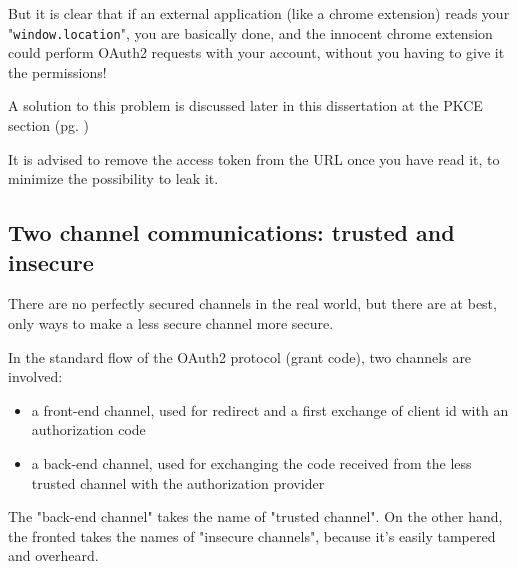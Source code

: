 But it is clear that if an external application (like a chrome extension) reads
your "\texttt{window.location}", you are basically done, and the innocent chrome
extension could perform OAuth2 requests with your account, without you having to
give it the permissions!

A solution to this problem is discussed later in this dissertation at the PKCE
section (pg. \pageref{pkce})

It is advised to remove the access token from the URL once you have read it, to
minimize the possibility to leak it.

\subsection{Two channel communications: trusted and insecure}
There are no perfectly secured channels in the real world, but there are at
best, only ways to make a less secure channel more secure.

In the standard flow of the OAuth2 protocol (grant code), two channels are
involved:
\begin{itemize}
    \item a front-end channel, used for redirect and a first exchange of client
        id with an authorization code
    \item a back-end channel, used for exchanging the code received from the
        less trusted channel with the authorization provider
\end{itemize}

The "back-end channel" takes the name of "trusted channel". On the other hand,
the fronted takes the names of "insecure channels", because it's easily tampered
and overheard.

